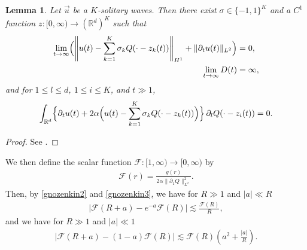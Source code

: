 \documentclass[reqno]{amsart}
\theoremstyle{plain}
\newtheorem{lemma}[theorem]{Lemma}
\theoremstyle{definition}
\numberwithin{equation}{section}
\newcommand{\1}{\mathbbm{1}}
\begin{document}
\begin{lemma}\label{modKsoli}
Let $\vec{u}$ be a $K$-solitary waves. Then there exist $\sigma\in\{-1,1\}^K$ and a $C^1$ function
$z:[0,\infty)\to (\mathbb{R}^d)^K$ such that
\begin{align}
\lim_{t\to\infty}\Bigl(\left\| u(t)-\sum_{k=1}^K \sigma_kQ(\cdot-z_k(t))\right\|_{H^1}
+\|{\partial}_tu(t)\|_{L^2}\Bigr)&=0,\label{modlim1yowa}
\\
\lim_{t\to\infty} D(t)&=\infty, \label{modlim2yowa}
\end{align}
and for $1\leq l\leq d$, $1\leq i\leq K$, and $t\gg 1$,
\begin{align}\label{modeqyowa}
\int_{\mathbb{R}^d} \Bigl\{ {\partial}_tu(t)+2\alpha\Bigl(u(t)-\sum_{k=1}^K \sigma_k Q(\cdot-z_k(t))\Bigr)\Bigr\}
\, {\partial}_lQ(\cdot-z_i(t))=0.
\end{align}
\end{lemma}
\begin{proof}
See \cite[Lemma 3.2]{I2}.
\end{proof}
We then define the scalar function $\mathcal{F}:[1,\infty)\to [0,\infty)$ by
\begin{align}\label{Fdef}
\mathcal{F}(r)=\frac{g(r)}{2\alpha\|{\partial}_1Q\|_{L^2}^2}.
\end{align}
Then, by \eqref{gnozenkin2} and \eqref{gnozenkin3}, we have for $R\gg 1$ and $|a|\ll R$
\begin{align}\label{tukaeruF1}
\left|\mathcal{F}(R+a)-e^{-a}\mathcal{F}(R)\right|\lesssim \frac{\mathcal{F}(R)}{R},
\end{align}
and we have for $R\gg1$ and $|a|\ll 1$
\begin{align}\label{tukaeruF2}
\left|\mathcal{F}(R+a)-(1-a)\mathcal{F}(R)\right|\lesssim \mathcal{F}(R)\left(a^2+\frac{|a|}{R}\right).
\end{align}
\end{document}
